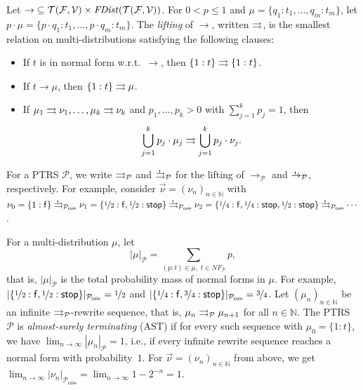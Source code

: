 Let ${\to} \subseteq \mathcal{T}(\mathcal{F},\mathcal{V}) \times \mathit{FDist}(\mathcal{T}(\mathcal{F},\mathcal{V}))$.
For $0 < p \leq 1$ and $\mu = \{q_1:t_1,\ldots,q_m:t_m\}$, let $p \cdot \mu = \{p\cdot q_1:t_1, \ldots, p\cdot q_m:t_m\}$.
The \emph{lifting} of $\to$, written $\rightrightarrows$, is the smallest relation on multi-distributions satisfying the following clauses:
\begin{itemize}[itemsep=0pt]
  \item If $t$ is in normal form w.r.t.\ $\to$, then $\{1:t\} \rightrightarrows \{1:t\}$.
  \item If $t \to \mu$, then $\{1:t\} \rightrightarrows \mu$.
  \item If $\mu_1 \rightrightarrows \nu_1,\ldots,\mu_k \rightrightarrows \nu_k$ and $p_1,\ldots,p_k > 0$ with $\sum_{j=1}^{k} p_j = 1$, then
  \[
    \bigcup_{j=1}^{k} p_j \cdot \mu_j \rightrightarrows \bigcup_{j=1}^{k} p_j \cdot \nu_j.
  \]
\end{itemize}
For a PTRS $\mathcal{P}$, we write $\rightrightarrows_\mathcal{P}$ and $\iliftto_\mathcal{P}$ for the lifting of $\to_\mathcal{P}$ and $\ito_\mathcal{P}$, respectively.
For example, consider $\vec{\nu} = (\nu_n)_{n \in \mathbb{N}}$ with $\nu_0 = \{1:\mathsf{f}\} 
\iliftto_{\mathcal{P}_{\mathsf{coin}}} \nu_1 = \{\nicefrac{1}{2}:\mathsf{f}, \linebreak \nicefrac{1}{2}:\mathsf{stop}\}
\iliftto_{\mathcal{P}_{\mathsf{coin}}} \nu_2 = \{\nicefrac{1}{4}:\mathsf{f},\nicefrac{1}{4}:\mathsf{stop},\nicefrac{1}{2}:\mathsf{stop}\} \iliftto_{\mathcal{P}_{\mathsf{coin}}} \cdots$.

For a multi-distribution $\mu$, let
\[
  |\mu|_{\mathcal{P}} = \sum_{(p:t) \in \mu,\; t \in \mathit{NF}_{\mathcal{P}}} p,
\]
that is, $|\mu|_{\mathcal{P}}$ is the total probability mass of normal forms in $\mu$.
For example,
$|\{\nicefrac{1}{2}:\mathsf{f},\nicefrac{1}{2}:\mathsf{stop}\}|_{\mathcal{P}_{\mathsf{coin}}} = \nicefrac{1}{2}$
and
$|\{\nicefrac{1}{4}:\mathsf{f},\nicefrac{3}{4}:\mathsf{stop}\}|_{\mathcal{P}_{\mathsf{coin}}} = \nicefrac{3}{4}$.
Let $(\mu_n)_{n \in \mathbb{N}}$ be an infinite $\rightrightarrows_\mathcal{P}$-rewrite sequence,
that is, $\mu_n \rightrightarrows_\mathcal{P} \mu_{n+1}$ for all $n \in \mathbb{N}$.
The PTRS $\mathcal{P}$ is \emph{almost-surely terminating} (AST) if for every such sequence with
$\mu_0 = \{1:t\}$, we have $\lim_{n \to \infty} |\mu_n|_{\mathcal{P}} = 1$, 
i.e., if every infinite rewrite sequence reaches a normal form with probability~$1$.
For $\vec{\nu} = (\nu_n)_{n \in \mathbb{N}}$ from above, we get
$\lim_{n \to \infty} |\nu_n|_{\mathcal{P}_{\mathsf{coin}}} = \lim_{n \to \infty} 1-2^{-n} = 1$.

